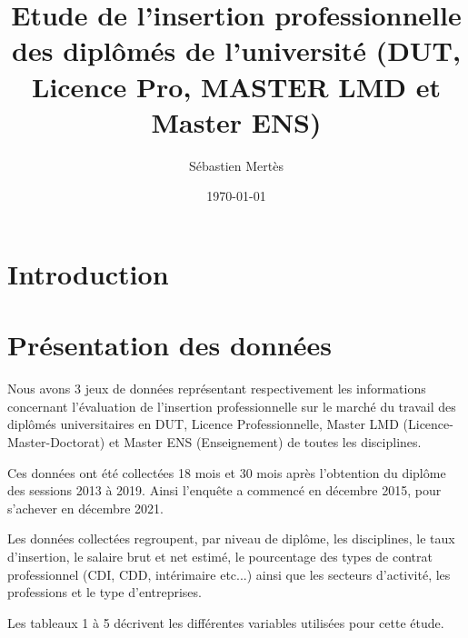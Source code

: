 \documentclass[12pt, a4paper, titlepage, table]{article}
\begin{document}
	\label{document}
	\title{Etude de l'insertion professionnelle des diplômés de l'université (DUT, Licence Pro, MASTER LMD et Master ENS)}
	\author{Sébastien Mertès}
	\date{\today}
	\maketitle
	\renewcommand{\thesection}{\arabic{section}.}
	\renewcommand{\thesubsection}{\thesection\arabic{subsection}}
	\renewcommand{\tablename}{Tableau}
	\renewcommand{\abstractname}{Résumé}
	\setlength{\parindent}{0pt}
	\captionsetup{labelfont=bf, font=small}
	\tableofcontents
	\newpage
	
\section{Introduction}
	
\section{Présentation des données}
	Nous avons 3 jeux de données représentant respectivement les informations concernant l'évaluation de l'insertion professionnelle sur le marché du travail des diplômés universitaires en DUT, Licence Professionnelle, Master LMD (Licence-Master-Doctorat) et Master ENS (Enseignement) de toutes les disciplines. 
	
	Ces données ont été collectées 18 mois et 30 mois après l'obtention du diplôme des sessions  2013 à 2019. Ainsi l'enquête a commencé en décembre 2015, pour s'achever en décembre 2021.
	
	Les données collectées regroupent, par niveau de diplôme, les disciplines, le taux d'insertion, le salaire brut et net estimé, le pourcentage des types de contrat professionnel (CDI, CDD, intérimaire etc...) ainsi que les secteurs d'activité, les professions et le type d'entreprises.
	
	Les tableaux 1 à 5 décrivent les différentes variables utilisées pour cette étude.
	
\newpage
\end{document}
